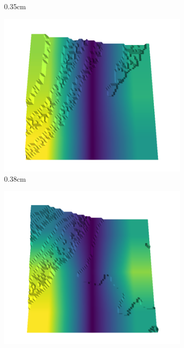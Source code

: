 \documentclass[../document.tex]{subfiles}
\begin{document}
\begin{figure}[H]
\begin{subfigure}[b]{0.192\linewidth}
    \caption{0.35cm}
    \label{fig : quarry-best-4}
    \end{subfigure}
    \begin{subfigure}[b]{0.192\linewidth}
    \includegraphics[width=\linewidth]{../img/5/quarry/best/38-patch-3d-majavi-colormap-40.png}
    \caption{0.38cm}
    \label{fig : quarry-best-5}
    \end{subfigure}
    \begin{subfigure}[b]{0.192\linewidth}
    \includegraphics[width=\linewidth]{../img/5/quarry/best/41-patch-3d-majavi-colormap-50.png}

\end{subfigure}
\end{figure}
\end{document}
